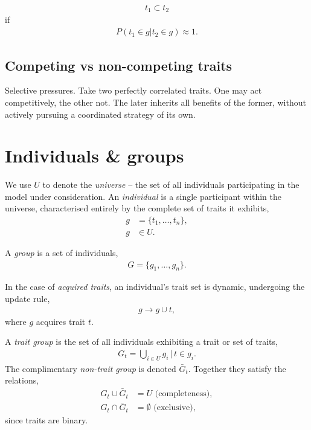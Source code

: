 \documentclass[twocolumn, aps, rmp, amsmath, amssymb, nofootinbib, superscriptaddress, longbibliography, floatfix, table-of-contents, eqsecnum]{revtex4-2}
\begin{document}
\begin{align}
t_1 \subset t_2	
\end{align}
if
\begin{align}
P(t_1\in g | t_2\in g)\approx 1.	
\end{align}

\subsection{Competing vs non-competing traits}

Selective pressures. Take two perfectly correlated traits. One may act competitively, the other not. The later inherits all benefits of the former, without actively pursuing a coordinated strategy of its own.

\section{Individuals \& groups}

We use $U$ to denote the \textit{universe} -- the set of all individuals participating in the model under consideration. An \textit{individual} is a single participant within the universe, characterised entirely by the complete set of traits it exhibits,
\begin{align}
	g &= \{t_1,\dots,t_n\},\nonumber\\
	g &\in U.
\end{align}

A \textit{group} is a set of individuals,
\begin{align}
	G = \{g_1,\dots,g_n\}.	
\end{align}

In the case of \textit{acquired traits}, an individual's trait set is dynamic, undergoing the update rule,
\begin{align}
	g\to g\cup t,	
\end{align}
where $g$ acquires trait $t$.

A \textit{trait group} is the set of all individuals exhibiting a trait or set of traits,
\begin{align}
	G_t = \bigcup_{i\in U} g_i \,|\, t\in g_i.
\end{align}
The complimentary \textit{non-trait group} is denoted $\bar G_t$. Together they satisfy the relations,
\begin{align}
G_t \cup \bar G_t &= U \,\,\text{(completeness)},\nonumber\\
G_t \cap \bar G_t &= \emptyset \,\,\text{(exclusive)},
\end{align}
since traits are binary.
\end{document}
